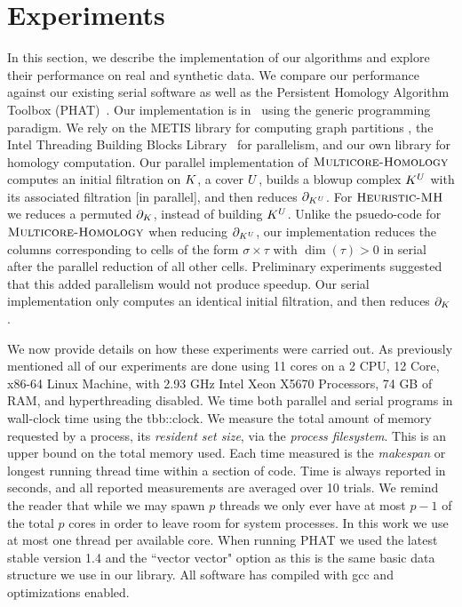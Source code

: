 \section{Experiments}

\label{sec:exp}
In this section, we describe the implementation of our algorithms
and explore their performance on real and synthetic data. We compare our
performance against our existing serial software as well as the Persistent Homology Algorithm Toolbox (PHAT)~\cite{bkr-cccph-13}. 
Our implementation is in \cplusplus\, using the generic programming paradigm. 
We rely on the METIS library for computing graph partitions 
\cite{KaKu95}, the Intel Threading Building Blocks 
Library~\cite{IntelTBB} for parallelism, and our own
library for homology computation. Our parallel implementation of $\textnormal{\scshape Multicore-Homology}$ computes
an initial filtration on $K$, a cover $U$, builds a blowup complex $K^{U}$ 
with its associated filtration [in parallel], and then reduces $\partial_{K^{U}}$.
For $\textnormal{\scshape Heuristic-MH}$ we reduces a permuted $\partial_K$, instead of building $K^{U}$.
Unlike the psuedo-code for $\textnormal{\scshape Multicore-Homology}$ when reducing $\partial_{K^{U}}$,
our implementation reduces the columns corresponding to cells of the form $\sigma \times \tau$ with $\dim{(\tau)} > 0$ in serial
after the parallel reduction of all other cells. Preliminary experiments suggested that
this added parallelism would not produce speedup. Our serial implementation only 
computes an identical initial filtration, and then reduces $\partial_K$.

We now provide details on how these experiments were carried out.
As previously mentioned all of our experiments are done 
using 11 cores on a 2 CPU, 12 Core, x86-64 Linux Machine, with 2.93 GHz Intel 
Xeon X5670 Processors, 74 GB of RAM, and hyperthreading disabled.
We time both parallel and serial programs in wall-clock time using the tbb::clock. 
We measure the total amount of memory requested by a process, its \emph{resident set size},
via the \emph{process filesystem}. This is an upper bound on the total memory used.  
Each time measured is the \emph{makespan} or longest running thread time within a section of code. 
Time is always reported in seconds, and all reported measurements are averaged over 10 trials.
We remind the reader that while we may spawn $p$ threads we only ever have at most $p-1$ of the total $p$ cores 
in order to leave room for system processes. In this work we use at most one thread per available 
core. When running PHAT we used the latest stable version 1.4 and the ``vector vector" option as 
this is the same basic data structure we use in our library. All software has compiled with gcc and optimizations
enabled.

